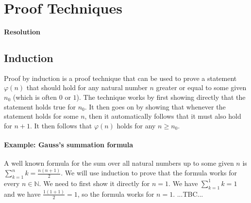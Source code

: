 
\section{Proof Techniques}







\paragraph{Resolution}


\subsection{Induction}
Proof by induction is a proof technique that can be used to prove a statement $\varphi(n)$ that should hold for any natural number $n$ greater or equal to some given $n_0$ (which is often $0$ or $1$). The technique works by first showing directly that the statement holds true for $n_0$. It then goes on by showing that whenever the statement holds for some $n$, then it automatically follows that it must also hold for $n+1$. It then follows that $\varphi(n)$ holds for any $n \geq n_0$.

\paragraph{Example: Gauss's summation formula} A well known formula for the sum over all natural numbers up to some given $n$ is $\sum_{k=1}^n k = \frac{n (n+1)}{2}$. We will use induction to prove that the formula works for every $n \in \mathbb{N}$. We need to first show it directly for $n=1$. We have $\sum_{k=1}^1 k = 1$ and we have $\frac{1 (1+1)}{2} = 1$, so the formula works for $n=1$. ...TBC...





